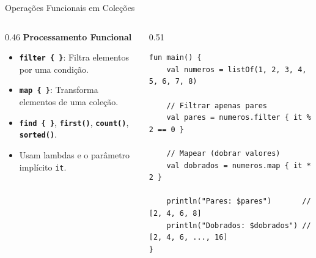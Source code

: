 \documentclass[aspectratio=169]{beamer}
\begin{document}
\begin{frame}[fragile]{Operações Funcionais em Coleções}
  \begin{columns}[T]
    \begin{column}{0.46\textwidth}
      \textbf{Processamento Funcional}
      \vspace{0.3em}
      \begin{itemize}\small
        \item \textbf{\texttt{filter \{ \}}}: Filtra elementos por uma condição.
        \item \textbf{\texttt{map \{ \}}}: Transforma elementos de uma coleção.
        \item \textbf{\texttt{find \{ \}}}, \textbf{\texttt{first()}}, \textbf{\texttt{count()}}, \textbf{\texttt{sorted()}}.
        \item Usam lambdas e o parâmetro implícito \texttt{it}.
      \end{itemize}
    \end{column}
    \begin{column}{0.51\textwidth}
\begin{lstlisting}[style=KotlinStyle]
fun main() {
    val numeros = listOf(1, 2, 3, 4, 5, 6, 7, 8)

    // Filtrar apenas pares
    val pares = numeros.filter { it % 2 == 0 }

    // Mapear (dobrar valores)
    val dobrados = numeros.map { it * 2 }

    println("Pares: $pares")       // [2, 4, 6, 8]
    println("Dobrados: $dobrados") // [2, 4, 6, ..., 16]
}
\end{lstlisting}
    \end{column}
  \end{columns}
\end{frame}
\end{document}
